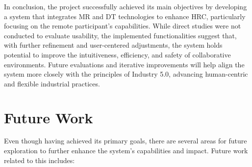 In conclusion, the project successfully achieved its main objectives by developing a system that integrates \ac{MR} and \ac{DT} technologies to enhance \ac{HRC}, particularly focusing on the remote participant's capabilities. While direct studies were not conducted to evaluate usability, the implemented functionalities suggest that, with further refinement and user-centered adjustments, the system holds potential to improve the intuitiveness, efficiency, and safety of collaborative environments. Future evaluations and iterative improvements will help align the system more closely with the principles of Industry 5.0, advancing human-centric and flexible industrial practices.


\section{Future Work}

Even though having achieved its primary goals, there are several areas for future exploration to further enhance the system's capabilities and impact.
Future work related to this includes:

